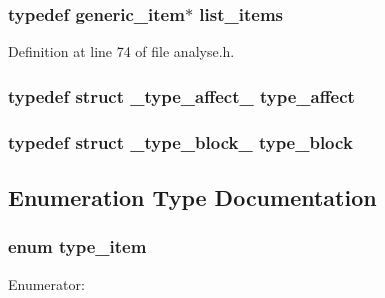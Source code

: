 \subsubsection[{list\_\-items}]{\setlength{\rightskip}{0pt plus 5cm}typedef {\bf generic\_\-item}$\ast$ {\bf list\_\-items}}\label{analyse_8h_a17fdb2898389e98566802871743b4932}


Definition at line 74 of file analyse.h.
\subsubsection[{type\_\-affect}]{\setlength{\rightskip}{0pt plus 5cm}typedef struct {\bf \_\-type\_\-affect\_\-}  {\bf type\_\-affect}}\label{analyse_8h_ab1cc58eda540d0cc169e48c42898c210}
\subsubsection[{type\_\-block}]{\setlength{\rightskip}{0pt plus 5cm}typedef struct {\bf \_\-type\_\-block\_\-}  {\bf type\_\-block}}\label{analyse_8h_a72489d637b7dbe95c78d1439a7b317e2}


\subsection{Enumeration Type Documentation}
\subsubsection[{type\_\-item}]{\setlength{\rightskip}{0pt plus 5cm}enum {\bf type\_\-item}}\label{analyse_8h_a6f3f9bfbd10818ff5891c0f505f79613}
\begin{Desc}
\item[Enumerator: ]\par
\begin{description}
\item[{\em 
TYPE\_\-BLOCK\label{analyse_8h_a6f3f9bfbd10818ff5891c0f505f79613abd5d7984039c921fb93343162a574853}
}]\item[{\em 
TYPE\_\-AFFECT\label{analyse_8h_a6f3f9bfbd10818ff5891c0f505f79613a9ad7ba0457adc1e31ac27dc2f00311f7}
}]\end{description}
\end{Desc}



